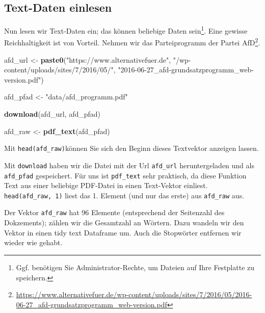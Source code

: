 \documentclass[12pt,ngerman,]{book}
\makeatletter
\newenvironment{Shaded}{\begin{snugshade}}{\end{snugshade}}
\newcommand{\KeywordTok}[1]{\textcolor[rgb]{0.13,0.29,0.53}{\textbf{{#1}}}}
\newcommand{\DataTypeTok}[1]{\textcolor[rgb]{0.13,0.29,0.53}{{#1}}}
\newcommand{\DecValTok}[1]{\textcolor[rgb]{0.00,0.00,0.81}{{#1}}}
\newcommand{\StringTok}[1]{\textcolor[rgb]{0.31,0.60,0.02}{{#1}}}
\newcommand{\CommentTok}[1]{\textcolor[rgb]{0.56,0.35,0.01}{\textit{{#1}}}}
\newcommand{\NormalTok}[1]{{#1}}
\let\rmarkdownfootnote\footnote%
\def\footnote{\protect\rmarkdownfootnote}
\newenvironment{kframe}{%
\medskip{}
\setlength{\fboxsep}{.8em}
 \def\at@end@of@kframe{}%
 \ifinner\ifhmode%
  \def\at@end@of@kframe{\end{minipage}}%
  \begin{minipage}{\columnwidth}%
 \fi\fi%
 \def\FrameCommand##1{\hskip\@totalleftmargin \hskip-\fboxsep
 \colorbox{shadecolor}{##1}\hskip-\fboxsep
     \hskip-\linewidth \hskip-\@totalleftmargin \hskip\columnwidth}%
 \MakeFramed {\advance\hsize-\width
   \@totalleftmargin\z@ \linewidth\hsize
   \@setminipage}}%
 {\par\unskip\endMakeFramed%
 \at@end@of@kframe}
\renewenvironment{Shaded}{\begin{kframe}}{\end{kframe}}
\makeatother
\begin{document}
\subsection{Text-Daten einlesen}\label{text-daten-einlesen}

Nun lesen wir Text-Daten ein; das können beliebige Daten sein\footnote{Ggf.
  benötigen Sie Administrator-Rechte, um Dateien auf Ihre Festplatte zu
  speichern.}. Eine gewisse Reichhaltigkeit ist von Vorteil. Nehmen wir
das Parteiprogramm der Partei AfD\footnote{\url{https://www.alternativefuer.de/wp-content/uploads/sites/7/2016/05/2016-06-27_afd-grundsatzprogramm_web-version.pdf}}.

\begin{Shaded}
\begin{Highlighting}[]
\NormalTok{afd_url <-}\StringTok{ }\KeywordTok{paste0}\NormalTok{(}\StringTok{"https://www.alternativefuer.de"}\NormalTok{,}
\StringTok{"/wp-content/uploads/sites/7/2016/05/"}\NormalTok{,}
\StringTok{"2016-06-27_afd-grundsatzprogramm_web-version.pdf"}\NormalTok{)}

\NormalTok{afd_pfad <-}\StringTok{ "data/afd_programm.pdf"}

\KeywordTok{download}\NormalTok{(afd_url, afd_pfad)}

\NormalTok{afd_raw <-}\StringTok{ }\KeywordTok{pdf_text}\NormalTok{(afd_pfad)}
\end{Highlighting}
\end{Shaded}

Mit \texttt{head(afd\_raw)}können Sie sich den Beginn dieses Textvektor
anzeigen lassen.

Mit \texttt{download} haben wir die Datei mit der Url \texttt{afd\_url}
heruntergeladen und als \texttt{afd\_pfad} gespeichert. Für uns ist
\texttt{pdf\_text} sehr praktisch, da diese Funktion Text aus einer
beliebige PDF-Datei in einen Text-Vektor einliest.
\texttt{head(afd\_raw,\ 1)} liest das 1. Element (und nur das erste) aus
\texttt{afd\_raw} aus.

Der Vektor \texttt{afd\_raw} hat 96 Elemente (entsprechend der
Seitenzahl des Dokzements); zählen wir die Gesamtzahl an Wörtern. Dazu
wandeln wir den Vektor in einen tidy text Dataframe um. Auch die
Stopwörter entfernen wir wieder wie gehabt.

\begin{Shaded}
\end{Shaded}
\end{document}
